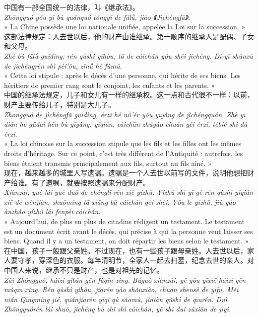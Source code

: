 \documentclass[11pt]{article}
\begin{document}
\begin{textebox}
中国有一部全国统一的法律，叫《继承法》。\\
\emph{Zhōngguó yǒu yī bù quánguó tǒngyī de fǎlǜ, jiào 《Jìchéngfǎ》.}\\
« La Chine possède une loi nationale unifiée, appelée la Loi sur la succession. »\\[0.4em]
这部法律规定：人去世以后，他的财产由谁继承。第一顺序的继承人是配偶、子女和父母。\\
\emph{Zhè bù fǎlǜ guīdìng: rén qùshì yǐhòu, tā de cáichǎn yóu shéi jìchéng. Dì-yī shùnxù de jìchéngrén shì pèi'ǒu, zǐnǚ hé fùmǔ.}\\
« Cette loi stipule : après le décès d'une personne, qui hérite de ses biens. Les héritiers de premier rang sont le conjoint, les enfants et les parents. »\\[0.4em]
中国的继承法规定，儿子和女儿有一样的继承权。这一点和古代很不一样：以前，财产主要传给儿子，特别是大儿子。\\
\emph{Zhōngguó de jìchéngfǎ guīdìng, érzi hé nǚ'ér yǒu yīyàng de jìchéngquán. Zhè yī diǎn hé gǔdài hěn bù yīyàng: yǐqián, cáichǎn zhǔyào chuán gěi érzi, tèbié shì dà érzi.}\\
« La loi chinoise sur la succession stipule que les fils et les filles ont les mêmes droits d'héritage. Sur ce point, c'est très différent de l'Antiquité : autrefois, les biens étaient transmis principalement aux fils, surtout au fils aîné. »\\[0.4em]
现在，越来越多的城里人写遗嘱。遗嘱是一个人去世以前写的文件，说明他想把财产给谁。有了遗嘱，就要按照遗嘱来分配财产。\\
\emph{Xiànzài, yuè lái yuè duō de chénglǐ rén xiě yízhǔ. Yízhǔ shì yī gè rén qùshì yǐqián xiě de wénjiàn, shuōmíng tā xiǎng bǎ cáichǎn gěi shéi. Yǒu le yízhǔ, jiù yào ànzhào yízhǔ lái fēnpèi cáichǎn.}\\
« Aujourd'hui, de plus en plus de citadins rédigent un testament. Le testament est un document écrit avant le décès, qui précise à qui la personne veut laisser ses biens. Quand il y a un testament, on doit répartir les biens selon le testament. »\\[0.4em]
在中国，孩子一般跟父亲姓。不过现在，也有一些孩子跟母亲姓。人去世以后，家人要守孝，穿深色的衣服。每年清明节，全家人一起去扫墓，纪念去世的亲人。对中国人来说，继承不只是财产，也是对祖先的记忆。\\
\emph{Zài Zhōngguó, háizi yībān gēn fùqīn xìng. Bùguò xiànzài, yě yǒu yīxiē háizi gēn mǔqīn xìng. Rén qùshì yǐhòu, jiārén yào shǒuxiào, chuān shēnsè de yīfu. Měi nián Qīngmíng jié, quánjiārén yīqǐ qù sǎomù, jìniàn qùshì de qīnrén. Duì Zhōngguórén lái shuō, jìchéng bù zhǐ shì cáichǎn, yě shì duì zǔxiān de jìyì.}\\

\end{textebox}
\end{document}
